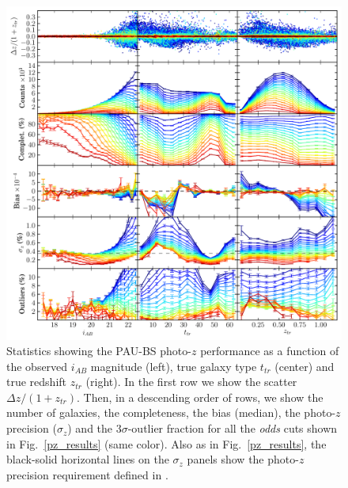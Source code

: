 \begin{figure}
\includegraphics[type=jpg,ext=.jpg,read=.jpg, width=130mm]{./plots/mock.r260.n1e6.s10.121027_default_bright_interp2}
\caption{Statistics showing the PAU-BS photo-$z$ performance as a function of the observed $i_{AB}$ magnitude (left), true galaxy type $t_{tr}$ (center) and true redshift $z_{tr}$ (right). In the first row we show the scatter $\Delta z/(1+z_{tr})$. Then, in a descending order of rows, we show the number of galaxies, the completeness, the bias (median), the photo-$z$ precision ($\sigma_z$) and the $3\sigma$-outlier fraction for all the \textit{odds} cuts shown in Fig.~\ref{pz_results} (same color). Also as in Fig.~\ref{pz_results}, the black-solid horizontal lines on the $\sigma_z$ panels show the photo-$z$ precision requirement defined in \citet{Gaztanaga2012}.}
\label{bs_pz_results}
\end{figure}

